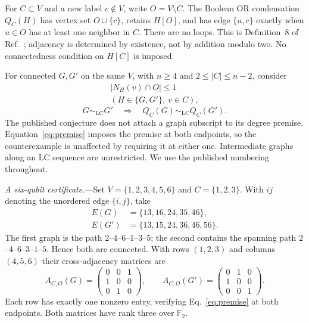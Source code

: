 \documentclass[aps,pra,reprint,amsmath,amssymb,longbibliography]{revtex4-2}
\newcommand{\LC}{\mathrm{LC}}
\begin{document}
For $C\subset V$ and a new label $c\notin V$, write $O=V\setminus C$. The Boolean OR condensation $Q_C(H)$ has vertex set $O\cup\{c\}$, retains $H[O]$, and has edge $\{u,c\}$ exactly when $u\in O$ has at least one neighbor in $C$. There are no loops. This is Definition~8 of Ref.~\cite{Vandre2025}; adjacency is determined by existence, not by addition modulo two. No connectedness condition on $H[C]$ is imposed.

For connected $G,G'$ on the same $V$, with $n\ge4$ and $2\le |C|\le n-2$, consider
\begin{equation}
\begin{gathered}
 |N_H(v)\cap O|\le1\\
 (H\in\{G,G'\},\ v\in C),
\end{gathered}\label{eq:premise}
\end{equation}
\begin{equation}
 G\sim_{\LC}G'\quad\Longrightarrow\quad
 Q_C(G)\sim_{\LC}Q_C(G').\label{eq:target}
\end{equation}
The published conjecture does not attach a graph subscript to its degree premise. Equation~\eqref{eq:premise} imposes the premise at both endpoints, so the counterexample is unaffected by requiring it at either one. Intermediate graphs along an LC sequence are unrestricted. We use the published numbering throughout.

\emph{A six-qubit certificate.}---Set $V=\{1,2,3,4,5,6\}$ and $C=\{1,2,3\}$. With $ij$ denoting the unordered edge $\{i,j\}$, take
\begin{align}
 E(G)&=\{13,16,24,35,46\},\label{eq:edges}\\
 E(G')&=\{13,15,24,36,46,56\}.\nonumber
\end{align}
The first graph is the path $2$--$4$--$6$--$1$--$3$--$5$; the second contains the spanning path $2$--$4$--$6$--$3$--$1$--$5$. Hence both are connected. With rows $(1,2,3)$ and columns $(4,5,6)$ their cross-adjacency matrices are
\begin{equation}
 A_{C,O}(G)=\begin{pmatrix}0&0&1\\1&0&0\\0&1&0\end{pmatrix},\qquad
 A_{C,O}(G')=\begin{pmatrix}0&1&0\\1&0&0\\0&0&1\end{pmatrix}.
 \label{eq:inputcuts}
\end{equation}
Each row has exactly one nonzero entry, verifying Eq.~\eqref{eq:premise} at both endpoints. Both matrices have rank three over $\mathbb F_2$.
\end{document}
